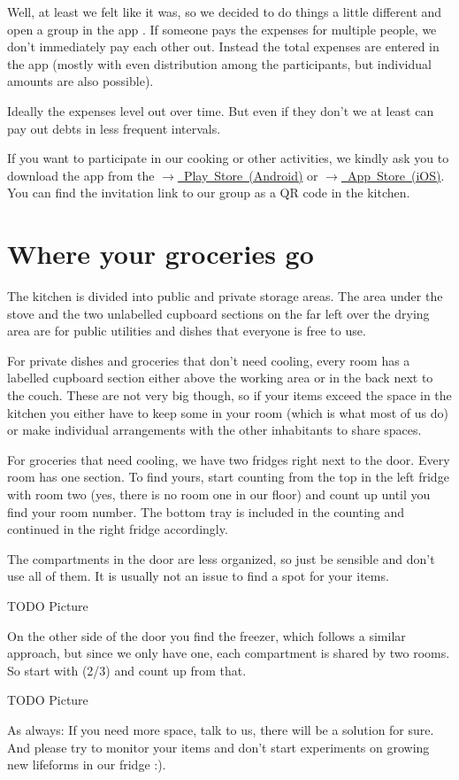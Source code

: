 Well, at least we felt like it was, so we decided to do things a little different and open a group in the app . If someone pays the expenses for multiple people, we don't immediately pay each other out. Instead the total expenses are entered in the app (mostly with even distribution among the participants, but individual amounts are also possible).

Ideally the expenses level out over time. But even if they don't we at least can pay out debts in less frequent intervals.

If you want to participate in our cooking or other activities, we kindly ask you to download the app from the \mbox{\href{https://play.google.com/store/apps/details?id=com.Splitwise.SplitwiseMobile&hl=de&pli=1}{$\xrightarrow{}$ Play Store (Android)}} or \mbox{\href{https://apps.apple.com/de/app/splitwise/id458023433}{$\xrightarrow{}$ App Store (iOS)}}. You can find the invitation link to our group as a QR code in the kitchen.

\section{Where your groceries go}
The kitchen is divided into public and private storage areas. The area under the stove and the two unlabelled cupboard sections on the far left over the drying area are for public utilities and dishes that everyone is free to use.

For private dishes and groceries that don't need cooling, every room has a labelled cupboard section either above the working area or in the back next to the couch. These are not very big though, so if your items exceed the space in the kitchen you either have to keep some in your room (which is what most of us do) or make individual arrangements with the other inhabitants to share spaces. 

For groceries that need cooling, we have two fridges right next to the door. Every room has one section. To find yours, start counting from the top in the left fridge with room two (yes, there is no room one in our floor) and count up until you find your room number. The bottom tray is included in the counting and continued in the right fridge accordingly.

The compartments in the door are less organized, so just be sensible and don't use all of them. It is usually not an issue to find a spot for your items.

{\color{darkred} TODO Picture}

On the other side of the door you find the freezer, which follows a similar approach, but since we only have one, each compartment is shared by two rooms. So start with (2/3) and count up from that.

{\color{darkred} TODO Picture}

As always: If you need more space, talk to us, there will be a solution for sure. And please try to monitor your items and don't start experiments on growing new lifeforms in our fridge :).